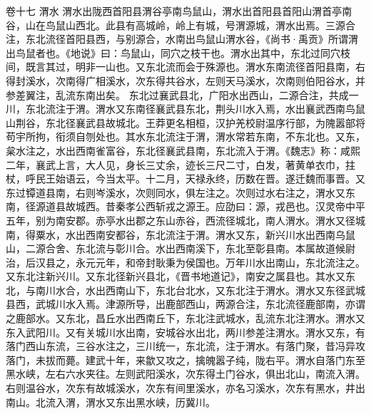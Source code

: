 \documentclass[12pt,UTF8]{ctexbook}
\begin{document}
卷十七  渭水 
渭水出陇西首阳县渭谷亭南鸟鼠山，渭水出首阳县首阳山渭首亭南谷，山在鸟鼠山西北。此县有高城岭，岭上有城，号渭源城，渭水出焉。三源合注，东北流径首阳县西，与别源合，水南出鸟鼠山渭水谷，《尚书·禹贡》所谓渭出鸟鼠者也。《地说》曰：鸟鼠山，同穴之枝干也。渭水出其中，东北过同穴枝间，既言其过，明非一山也。又东北流而会于殊源也。渭水东南流径首阳县南，右得封溪水，次南得广相溪水，次东得共谷水，左则天马溪水，次南则伯阳谷水，并参差翼注，乱流东南出矣。
东北过襄武县北，广阳水出西山，二源合注，共成一川，东北流注于渭。渭水又东南径襄武县东北，荆头川水入焉，水出襄武西南鸟鼠山荆谷，东北径襄武县故城北。王莽更名相桓，汉护羌校尉温序行部，为隗嚣部将苟宇所拘，衔须自刎处也。其水东北流注于渭，渭水常若东南，不东北也。又东，枲水注之，水出西南雀富谷，东北径襄武县南，东北流入于渭。《魏志》称：咸熙二年，襄武上言，大人见，身长三丈余，迹长三尺二寸，白发，著黄单衣巾，拄杖，呼民王始语云，今当太平。十二月，天禄永终，历数在晋。遂迁魏而事晋。又东过镡道县南，右则岑溪水，次则同水，俱左注之。次则过水右注之，渭水又东南，径源道县故城西。昔秦孝公西斩戎之源王。应劭曰：源，戎邑也。汉灵帝中平五年，别为南安郡。赤亭水出郡之东山赤谷，西流径城北，南人渭水。渭水又径城南，得粟水，水出西南安都谷，东北流注于渭。渭水又东，新兴川水出西南乌鼠山，二源合舍、东北流与彰川合。水出西南溪下，东北至彰县南。本属故道候尉治，后汉县之，永元元年，和帝封耿秉为侯国也。万年川水出南山，东北流注之。又东北注新兴川。又东北径新兴县北，《晋书地道记》，南安之属县也。其水又东北，与南川水合，水出西南山下，东北台北水，又东北注于渭水。渭水又东径武城县西，武城川水入焉。津源所导，出鹿部西山，两源合注，东北流径鹿部南，亦谓之鹿部水。又东北，昌丘水出西南丘下，东北注武城水，乱流东北注渭水。渭水又东入武阳川。又有关城川水出南，安城谷水出北，两川参差注渭水。渭水又东，有落门西山东流，三谷水注之，三川统一，东北流，注于渭水。有落门聚，昔冯异攻落门，未拔而薨。建武十年，来歙又攻之，擒魄嚣子纯，陇右平。渭水自落门东至黑水峡，左右六水夹往。左则武阳溪水，次东得土门谷水，俱出北山，南流入渭。右则温谷水，次东有故城溪水，次东有间里溪水，亦名习溪水，次东有黑水，井出南山。北流入渭，渭水又东出黑水峡，历冀川。
\end{document}
